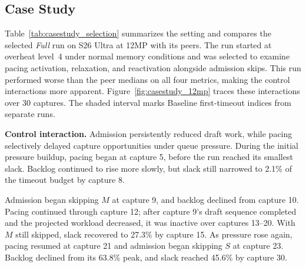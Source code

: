 \subsection{Case Study}
\label{sec:casestudy}




Table~\ref{tab:casestudy_selection} summarizes the setting and compares the selected \emph{Full} run on S26 Ultra at 12MP with its peers.
The run started at overheat level~4 under normal memory conditions and was selected to examine pacing activation, relaxation, and reactivation alongside admission skips.
This run performed worse than the peer medians on all four metrics, making the control interactions more apparent.
Figure~\ref{fig:casestudy_12mp} traces these interactions over 30 captures.
The shaded interval marks Baseline first-timeout indices from separate runs.

\smallskip\noindent\textbf{Control interaction.}
Admission persistently reduced draft work, while pacing selectively delayed capture opportunities under queue pressure.
During the initial pressure buildup, pacing began at capture 5, before the run reached its smallest slack.
Backlog continued to rise more slowly, but slack still narrowed to 2.1\% of the timeout budget by capture 8.

Admission began skipping \(M\) at capture 9, and backlog declined from capture 10.
Pacing continued through capture 12; after capture 9's draft sequence completed and the projected workload decreased, it was inactive over captures 13--20.
With \(M\) still skipped, slack recovered to 27.3\% by capture 15.
As pressure rose again, pacing resumed at capture 21 and admission began skipping \(S\) at capture 23.
Backlog declined from its 63.8\% peak, and slack reached 45.6\% by capture 30.
